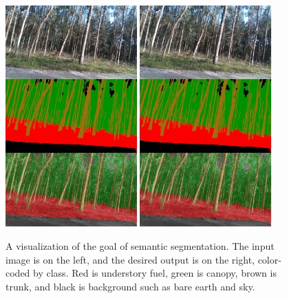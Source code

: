 \begin{figure}
    \centering
    \includegraphics[width=0.45\textwidth, trim={0 340px 0 0}, clip]{figs/background/automated_understanding/segmentation_example.png}
    \includegraphics[width=0.45\textwidth, trim={0 170 0 170}, clip]{figs/background/automated_understanding/segmentation_example.png}
    \caption{A visualization of the goal of semantic segmentation. The input image is on the left, and the desired output is on the right, color-coded by class. Red is understory fuel, green is canopy, brown is trunk, and black is background such as bare earth and sky.}
    \label{fig:background:semantic_seg_example}
\end{figure}

